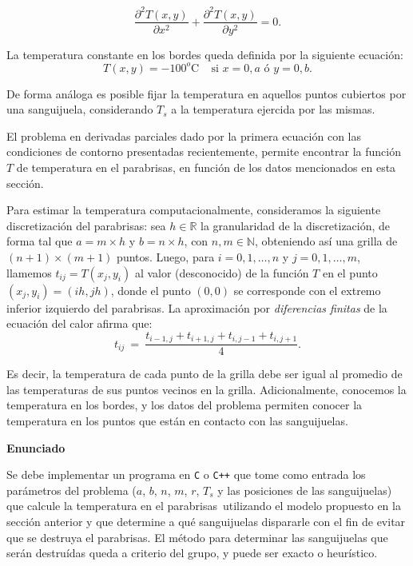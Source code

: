 \documentclass[11pt, a4paper]{article}
\newcommand{\atacante}{sanguijuela}
\newcommand{\objeto}{parabrisas}
\begin{document}
\begin{equation}\label{eq:calor}
\frac{\partial^2T(x,y)}{\partial x^{2}}+\frac{\partial^2 T(x,y)}{\partial y^{2}} = 0.
\end{equation}

\noindent La temperatura constante en los bordes queda definida por la siguiente ecuaci\'on:
\begin{equation}
T(x,y) = -100^o\textrm{C}~~~~~\textrm{si } x = 0,a \textrm{ \'o } y = 0,b.
\label{eq:borde}
\end{equation}

\noindent De forma an\'aloga es posible fijar la temperatura en aquellos puntos cubiertos por una \atacante, considerando $T_s$ a la temperatura ejercida por las mismas.

El problema en derivadas parciales dado por la primera ecuaci\'on con las condiciones de contorno presentadas recientemente, permite encontrar la funci\'on $T$ de temperatura en el \objeto, en funci\'on de los datos mencionados en esta secci\'on.

Para estimar la temperatura computacionalmente, con\-si\-de\-ra\-mos la siguiente discretizaci\'on del \objeto: sea $h \in \mathbb{R}$ la granularidad de la discretizaci\'on, de forma tal que $a = m\times h$ y $b = n \times h$, con $n,m \in \mathbb{N}$, obteniendo as\'i una grilla de $(n+1)\times(m+1)$ puntos. Luego, para $i=0,1,\dots,n$ y $j=0,1,\dots,m$, llamemos $t_{ij} = T(x_j,y_i)$ al valor (desconocido) de la funci\'on $T$ en el punto $(x_j, y_i) = (ih, jh)$, donde el punto $(0,0)$ se corresponde con el extremo inferior izquierdo del \objeto.
La aproximaci\'on por \emph{diferencias finitas} de la ecuaci\'on del calor afirma que:
\begin{equation}
t_{ij} \ =\ \frac{ t_{i-1,j} + t_{i+1,j} + t_{i,j-1} + t_{i,j+1}}{4}.\label{eq:calordd}
\end{equation}

Es decir, la temperatura de cada punto de la grilla debe ser igual al promedio de las tem\-pe\-ra\-tu\-ras de sus puntos vecinos en la grilla. Adicionalmente, conocemos la temperatura en los bordes, y los datos del problema permiten conocer la temperatura en los puntos que est\'an en contacto con las \atacante s.

{\noindent \bf Enunciado}

Se debe implementar un programa en \verb+C+ o \verb-C++- que tome como entrada los par\'ametros del problema ($a$, $b$, $n$, $m$, $r$, $T_s$ y las posiciones de las \atacante s) que calcule la temperatura en el \objeto\ utilizando el modelo propuesto en la secci\'on anterior y que determine a qu\'e \atacante s dispararle con el fin de evitar que se destruya el \objeto. El m\'etodo para determinar las \atacante s que ser\'an destru\'idas queda a criterio del grupo, y puede ser exacto o heur\'istico.
\end{document}
